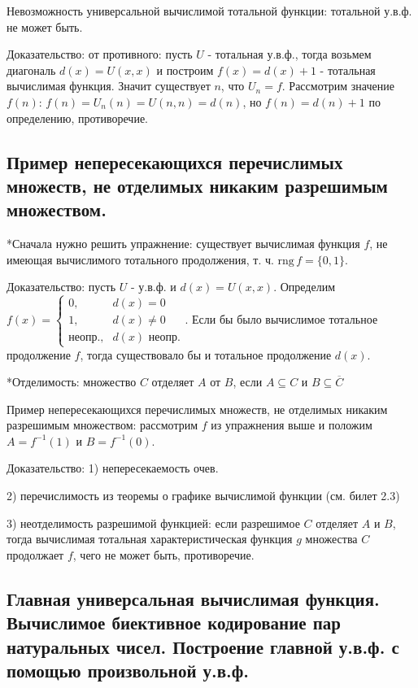 \documentclass[a4paper, 10pt]{article}
\newcommand{\rng}{\text{rng}\,}
\begin{document}
Невозможность универсальной вычислимой тотальной функции: тотальной у.в.ф. не может быть.

Доказательство: от противного: пусть $U$ - тотальная у.в.ф., тогда возьмем диагональ $d(x)=U(x,x)$ и построим $f(x)=d(x)+1$ - тотальная вычислимая функция. Значит существует $n$, что $U_n=f$. Рассмотрим значение $f(n)$: $f(n)=U_n(n)=U(n,n)=d(n)$, но $f(n)=d(n)+1$ по определению, противоречие.

\subsection{Пример непересекающихся перечислимых множеств, не отделимых никаким разрешимым множеством.}

*Сначала нужно решить упражнение: существует вычислимая функция $f$, не имеющая вычислимого тотального продолжения, т. ч. $\rng f = \{0, 1\}$.

Доказательство: пусть $U$ - у.в.ф. и $d(x)=U(x,x)$. Определим $f(x)=\begin{cases}
    0,&d(x)=0 \\
    1,&d(x)\not=0 \\
    \text{неопр.,}&d(x)\text{ неопр.}
\end{cases}$. Если бы было вычислимое тотальное продолжение $f$, тогда существовало бы и тотальное продолжение $d(x)$.

\hfill

*Отделимость: множество $C$ отделяет $A$ от $B$, если $A\subseteq C$ и $B\subseteq \overline{C}$

Пример непересекающихся перечислимых множеств, не отделимых никаким разрешимым множеством: рассмотрим $f$ из упражнения выше и положим $A=f^{-1}(1)$ и $B=f^{-1}(0)$.

Доказательство: 1) непересекаемость очев.

2) перечислимость из теоремы о графике вычислимой функции (см. билет 2.3)

3) неотделимость разрешимой функцией: если разрешимое $C$ отделяет $A$ и $B$, тогда вычислимая тотальная характеристическая функция $g$ множества $C$ продолжает $f$, чего не может быть, противоречие.

\subsection{Главная универсальная вычислимая функция. Вычислимое биективное кодирование пар натуральных чисел. Построение главной у.в.ф. с помощью произвольной у.в.ф.}
\end{document}
